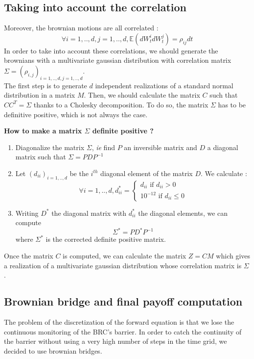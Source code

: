 \documentclass[a4paper,11pt,english]{book}
\begin{document}
\subsection{Taking into account the correlation}
Moreover, the brownian motions are all correlated : $$\forall i=1,..,d,j=1,..,d, \mathbb{E}(dW_{t}^{i}dW_{t}^{j})=\rho_{ij}dt$$
In order to take into account these correlations, we should generate the brownians with a multivariate gaussian distribution with correlation matrix $\Sigma=(\rho_{i,j})_{i=1,..,d,j=1,..,d}$.\\

The first step is to generate $d$ independent realizations of a standard normal distribution in a matrix $M$. Then, we should calculate the matrix $C$ such that $CC^{T}=\Sigma$ thanks to a Cholesky decomposition. To do so, the matrix $\Sigma$ has to be definitive positive, which is not always the case. \\

\begin{tcolorbox}[breakable,colback=cyan,opacityfill=0.05,colframe=blue,width=\dimexpr\textwidth+12mm\relax,enlarge left by=-6mm]
\begin{center}
\vspace{0.2cm}
\textbf{How to make a matrix $\Sigma$ definite positive ?}
\end{center}
\begin{enumerate}
    \item Diagonalize the matrix $\Sigma$, \textit{ie} find $P$ an inversible matrix and $D$ a diagonal matrix such that $\Sigma=PDP^{-1}$
    \item Let $(d_{ii})_{i=1,..,d}$ be the $i^{th}$ diagonal element of the matrix $D$. We calculate : $$\forall i=1,..,d, d_{ii}^{*}=\left\{
    \begin{array}{ll}
        d_{ii} \text{ if } d_{ii}>0 \\
        10^{-12} \text{ if } d_{ii}\leq0
    \end{array}
\right.$$
 \item Writing $D^{*}$ the diagonal matrix with $d_{ii}^{*}$ the diagonal elements, we can compute $$\Sigma^{*}=PD^{*}P^{-1}$$ where $\Sigma^{*}$ is the corrected definite positive matrix.
\end{enumerate}
\end{tcolorbox}
Once the matrix $C$ is computed, we can calculate the matrix $Z=CM$ which gives a realization of a multivariate gaussian distribution whose correlation matrix is $\Sigma$.
\subsection{Brownian bridge and final payoff computation}
\label{subsec:brownian-bridge}
The problem of the discretization of the forward equation is that we lose the continuous monitoring of the BRC's barrier. In order to catch the continuity of the barrier without using a very high number of steps in the time grid, we decided to use brownian bridges.\\
\end{document}
